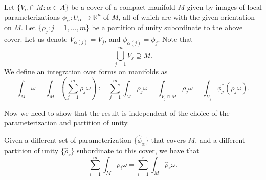 \documentclass[notoc,notitlepage]{tufte-book}
\begin{document}
\begin{defn}\label{defn:integral_over_manifolds}
  Let $\{ V_\alpha \cap M : \alpha \in A \}$ be a cover of a compact manifold
  $M$ given by images of local parameterizations $\phi_\alpha : U_\alpha \to
  \mathbb{R}^n$ of $M$, all of which are  with the given
  orientation on $M$.  Let $\{ \rho_j : j = 1, \ldots, m \}$ be a
  \hyperref[thm:partition_of_unity]{partition of unity} subordinate to the above
  cover. Let us denote $V_{\alpha(j)} = V_j$, and $\phi_{\alpha(j)} = \phi_j$.
  Note that
  \begin{equation*}
    \bigcup_{j=1}^{m} V_j \supseteq M.
  \end{equation*}
  We define an integration over forms on manifolds as
  \begin{equation*}
    \int_{M} \omega = \int_{M} \left( \sum_{j=1}^{m} \rho_j \omega \right) :=
    \sum_{j=1}^{m} \int_{M} \rho_j \omega = \int_{V_j \cap M} \rho_j \omega =
    \int_{U_j} \phi_j^* (\rho_j \omega).
  \end{equation*}
\end{defn}

Now we need to show that the result is independent of the choice of the
parameterization and partition of unity.

\begin{propo}\label{propo:independence_of_the_integral_from_the_choice_of_parameterization_and_partition_of_unity}
  Given a different set of parameterization $\{ \hat{\phi}_\alpha \}$ that
  covers $M$, and a different partition of unity $\{ \hat{\rho}_r \}$ 
  subordinate to this cover, we have that
  \begin{equation*}
    \sum_{i=1}^{m} \int_{M} \rho_i \omega = \sum_{i=1}^{r} \int_{M} \hat{\rho}_r
    \omega.
  \end{equation*}
\end{propo}
\end{document}
